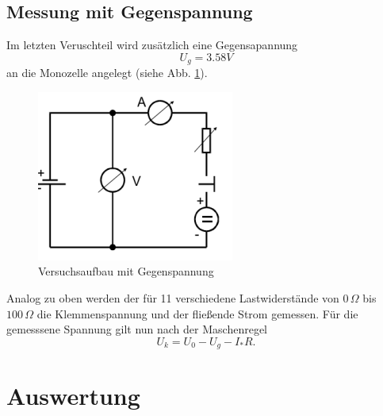 \documentclass[11pt]{article}
\begin{document}
\subsection{Messung mit Gegenspannung}
Im letzten Veruschteil wird zus\"atzlich eine Gegensapannung 
\[
U_g = 3.58 V 
\] an die Monozelle angelegt (siehe Abb. \ref{Aufbau2}). 
\begin{figure}[htp]
\centering
\includegraphics[scale=1.00]{abb2.png}
\caption{Versuchsaufbau mit Gegenspannung}
\label{Aufbau2}
\end{figure}Analog zu oben werden der f\"ur 11 verschiedene Lastwiderst\"ande von $0\,\Omega$ bis $100\,\Omega$ die Klemmenspannung und der flie\ss ende Strom gemessen. F\"ur die gemesssene Spannung gilt nun nach der Maschenregel
\begin{equation}
U_k = U_0 - U_g - I_*R.
\end{equation}
\section{Auswertung}
\end{document}
